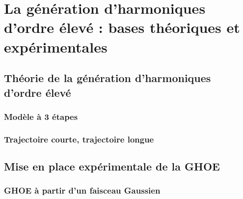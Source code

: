 \part{La génération d'harmoniques d'ordre élevé : bases théoriques et expérimentales}
\chapter{Théorie de la génération d'harmoniques d'ordre élevé}
\section{Modèle à 3 étapes}
\section{Trajectoire courte, trajectoire longue}
\label{sec:thTraj}
\chapter{Mise en place expérimentale de la GHOE}
\section{GHOE à partir d'un faisceau Gaussien}
\label{sec:expHHG}
